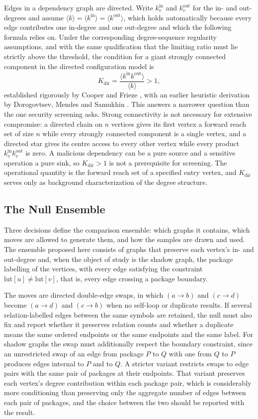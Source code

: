 \documentclass[11pt]{article}
\begin{document}
Edges in a dependency graph are directed. Write $k^{\mathrm{in}}_v$ and $k^{\mathrm{out}}_v$ for the in- and out-degrees and assume $\langle k\rangle=\langle k^{\mathrm{in}}\rangle=\langle k^{\mathrm{out}}\rangle$, which holds automatically because every edge contributes one in-degree and one out-degree and which the following formula relies on. Under the corresponding degree-sequence regularity assumptions, and with the same qualification that the limiting ratio must lie strictly above the threshold, the condition for a giant strongly connected component in the directed configuration model is
\[
K_{\mathrm{dir}}=\frac{\langle k^{\mathrm{in}}k^{\mathrm{out}}\rangle}{\langle k\rangle}>1,
\]
established rigorously by Cooper and Frieze \cite{CooperFrieze2004}, with an earlier heuristic derivation by Dorogovtsev, Mendes and Samukhin \cite{Dorogovtsev2001}. This answers a narrower question than the one security screening asks. Strong connectivity is not necessary for extensive compromise: a directed chain on $n$ vertices gives its first vertex a forward reach set of size $n$ while every strongly connected component is a single vertex, and a directed star gives its centre access to every other vertex while every product $k^{\mathrm{in}}_vk^{\mathrm{out}}_v$ is zero. A malicious dependency can be a pure source and a sensitive operation a pure sink, so $K_{\mathrm{dir}}>1$ is not a prerequisite for screening. The operational quantity is the forward reach set of a specified entry vertex, and $K_{\mathrm{dir}}$ serves only as background characterization of the degree structure.

\subsection{The Null Ensemble}

Three decisions define the comparison ensemble: which graphs it contains, which moves are allowed to generate them, and how the samples are drawn and used. The ensemble proposed here consists of graphs that preserve each vertex's in- and out-degree and, when the object of study is the shadow graph, the package labelling of the vertices, with every edge satisfying the constraint $\mathrm{lut}[u]\neq\mathrm{lut}[v]$, that is, every edge crossing a package boundary.

The moves are directed double-edge swaps, in which $(a\to b)$ and $(c\to d)$ become $(a\to d)$ and $(c\to b)$ when no self-loop or duplicate results. If several relation-labelled edges between the same symbols are retained, the null must also fix and report whether it preserves relation counts and whether a duplicate means the same ordered endpoints or the same endpoints and the same label. For shadow graphs the swap must additionally respect the boundary constraint, since an unrestricted swap of an edge from package $P$ to $Q$ with one from $Q$ to $P$ produces edges internal to $P$ and to $Q$. A stricter variant restricts swaps to edge pairs with the same pair of packages at their endpoints. That variant preserves each vertex's degree contribution within each package pair, which is considerably more conditioning than preserving only the aggregate number of edges between each pair of packages, and the choice between the two should be reported with the result.
\end{document}
